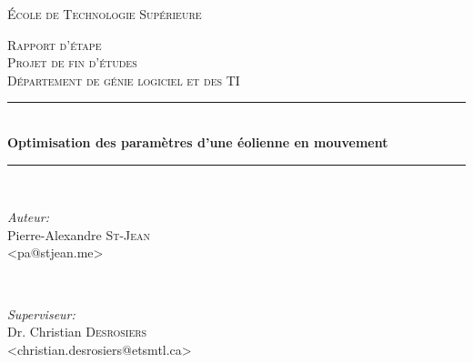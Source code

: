 \begin{titlepage}
\thispagestyle{fancy}

\newcommand{\HRule}{\rule{\linewidth}{0.5mm}} %

\center %
 

\textsc{\LARGE École de Technologie Supérieure}\\[1.5cm] %

\vfill

\textsc{\Large Rapport d'étape}\\[0.5cm] %
\textsc{\large Projet de fin d'études \\ Département de génie logiciel et des TI}\\[0.5cm] %



\HRule \\[0.4cm]
{ \huge \bfseries Optimisation des paramètres d’une éolienne en mouvement}\\[0.4cm] %
\HRule \\[1.5cm]
 

\begin{minipage}{0.4\textwidth}
\begin{flushleft} \large
\emph{Auteur:}\\
Pierre-Alexandre \textsc{St-Jean}\\
\small{<pa@stjean.me>}
\end{flushleft}
\end{minipage}
~
\begin{minipage}{0.4\textwidth}
\begin{flushright} \large
\emph{Superviseur:} \\
Dr. Christian \textsc{Desrosiers}\\
\small{<christian.desrosiers@etsmtl.ca>}
\end{flushright}
\end{minipage}\\[4cm]


\end{titlepage}
